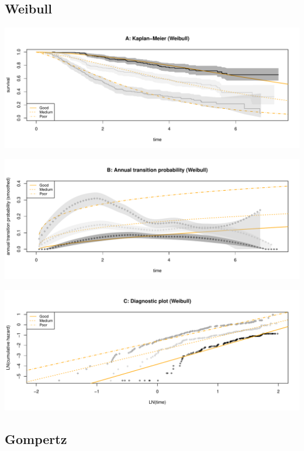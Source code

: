 \documentclass[
]{article}
\begin{document}
\hypertarget{weibull}{%
\subsection{Weibull}\label{weibull}}

\begin{flushleft}\includegraphics[height=0.25\textheight]{Images/weib-1} \end{flushleft}

\begin{flushleft}\includegraphics[height=0.25\textheight]{Images/weib-2} \end{flushleft}

\begin{flushleft}\includegraphics[height=0.25\textheight]{Images/weib-3} \end{flushleft}

\clearpage

\hypertarget{gompertz}{%
\subsection{Gompertz}\label{gompertz}}
\end{document}
